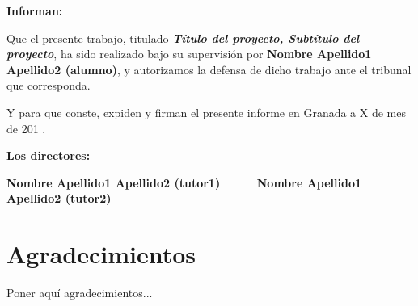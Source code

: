 \vspace{0.5cm}

\textbf{Informan:}

\vspace{0.5cm}

Que el presente trabajo, titulado \textit{\textbf{Título del proyecto, Subtítulo del proyecto}},
ha sido realizado bajo su supervisión por \textbf{Nombre Apellido1 Apellido2 (alumno)}, y autorizamos la defensa de dicho trabajo ante el tribunal
que corresponda.

\vspace{0.5cm}

Y para que conste, expiden y firman el presente informe en Granada a X de mes de 201 .

\vspace{1cm}

\textbf{Los directores:}

\vspace{5cm}

\noindent \textbf{Nombre Apellido1 Apellido2 (tutor1) \ \ \ \ \ Nombre Apellido1 Apellido2 (tutor2)}

\chapter*{Agradecimientos}
\thispagestyle{empty}

       \vspace{1cm}


Poner aquí agradecimientos...

